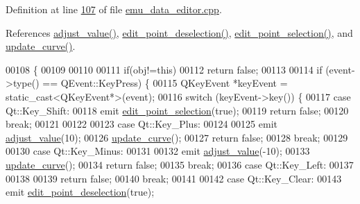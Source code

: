 Definition at line \hyperlink{a00035_source_l00107}{107} of file \hyperlink{a00035_source}{emu\+\_\+data\+\_\+editor.\+cpp}.



References \hyperlink{a00014_source_l00263}{adjust\+\_\+value()}, \hyperlink{a00014_source_l00256}{edit\+\_\+point\+\_\+deselection()}, \hyperlink{a00014_source_l00249}{edit\+\_\+point\+\_\+selection()}, and \hyperlink{a00035_source_l00284}{update\+\_\+curve()}.


\begin{DoxyCode}
00108 \{
00109 
00110 
00111     \textcolor{keywordflow}{if}(obj!=\textcolor{keyword}{this})
00112         \textcolor{keywordflow}{return} \textcolor{keyword}{false};
00113 
00114         \textcolor{keywordflow}{if} (event->type() == QEvent::KeyPress) \{
00115             QKeyEvent *keyEvent = \textcolor{keyword}{static\_cast<}QKeyEvent*\textcolor{keyword}{>}(event);
00116             \textcolor{keywordflow}{switch} (keyEvent->key()) \{
00117             \textcolor{keywordflow}{case} Qt::Key\_Shift:
00118                     emit \hyperlink{a00004_a9aa2af0c329358fd96f7fb6b7f02bfe1}{edit\_point\_selection}(\textcolor{keyword}{true});
00119                   \textcolor{keywordflow}{return} \textcolor{keyword}{false};
00120                  \textcolor{keywordflow}{break};
00121 
00122 
00123             \textcolor{keywordflow}{case} Qt::Key\_Plus:
00124 
00125                     emit \hyperlink{a00004_a74d292de22b341313df1852cb1033704}{adjust\_value}(10);
00126                     \hyperlink{a00004_a15cbcf5f0a17281468800f47898f60c1}{update\_curve}();
00127                     \textcolor{keywordflow}{return} \textcolor{keyword}{false};
00128                  \textcolor{keywordflow}{break};
00129 
00130             \textcolor{keywordflow}{case} Qt::Key\_Minus:
00131 
00132                     emit \hyperlink{a00004_a74d292de22b341313df1852cb1033704}{adjust\_value}(-10);
00133                     \hyperlink{a00004_a15cbcf5f0a17281468800f47898f60c1}{update\_curve}();
00134                     \textcolor{keywordflow}{return} \textcolor{keyword}{false};
00135                 \textcolor{keywordflow}{break};
00136             \textcolor{keywordflow}{case} Qt::Key\_Left:
00137 
00138 
00139                     \textcolor{keywordflow}{return} \textcolor{keyword}{false};
00140                 \textcolor{keywordflow}{break};
00141 
00142             \textcolor{keywordflow}{case} Qt::Key\_Clear:
00143                     emit \hyperlink{a00004_a2b9629d20c2b97c01bf8486c89fd0148}{edit\_point\_deselection}(\textcolor{keyword}{true});

\end{DoxyCode}
